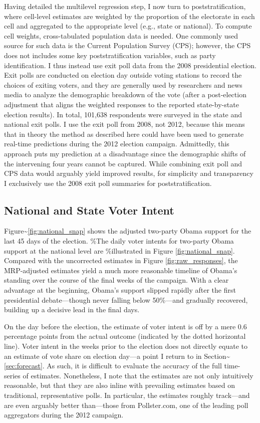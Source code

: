 Having detailed the multilevel regression step, I now turn to
poststratification, where cell-level estimates are weighted by the
proportion of the electorate in each cell and aggregated to the
appropriate level (e.g., state or national). To compute cell weights,
cross-tabulated population data is needed. One commonly used source for
such data is the Current Population Survey (CPS); however, the CPS does
not includes some key poststratification variables, such as party
identification. I thus instead use exit poll data from the 2008
presidential election. Exit polls are conducted on election day outside
voting stations to record the choices of exiting voters, and they are
generally used by researchers and news media to analyze the demographic
breakdown of the vote (after a post-election adjustment that aligns the
weighted responses to the reported state-by-state election results). In
total, 101,638 respondents were surveyed in the state and national exit
polls. I use the exit poll from 2008, not 2012, because this means that
in theory the method as described here could have been used to generate
real-time predictions during the 2012 election campaign. Admittedly,
this approach puts my prediction at a disadvantage since the demographic
shifts of the intervening four years cannot be captured. While combining
exit poll and CPS data would arguably yield improved results, for
simplicity and transparency I exclusively use the 2008 exit poll
summaries for poststratification.

\subsection{National and State Voter
Intent}\label{national-and-state-voter-intent}

Figure\textasciitilde{}\ref{fig:national_snap} shows the adjusted
two-party Obama support for the last 45 days of the election. \%The
daily voter intents for two-party Obama support at the national level
are \%illustrated in Figure \ref{fig:national_snap}. Compared with the
uncorrected estimates in Figure \ref{fig:raw_responses}, the
MRP-adjusted estimates yield a much more reasonable timeline of Obama's
standing over the course of the final weeks of the campaign. With a
clear advantage at the beginning, Obama's support slipped rapidly after
the first presidential debate---though never falling below 50\%---and
gradually recovered, building up a decisive lead in the final days.

On the day before the election, the estimate of voter intent is off by a
mere 0.6 percentage points from the actual outcome (indicated by the
dotted horizontal line). Voter intent in the weeks prior to the election
does not directly equate to an estimate of vote share on election
day---a point I return to in Section\textasciitilde{}\ref{sec:forecast}.
As such, it is difficult to evaluate the accuracy of the full
time-series of estimates. Nonetheless, I note that the estimates are not
only intuitively reasonable, but that they are also inline with
prevailing estimates based on traditional, representative polls. In
particular, the estimates roughly track---and are even arguably better
than---those from Pollster.com, one of the leading poll aggregators
during the 2012 campaign.

